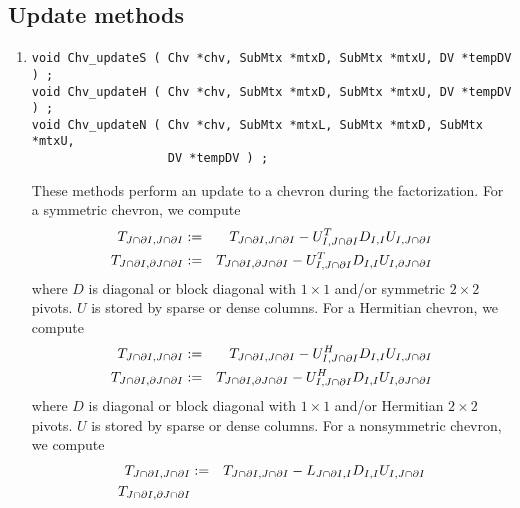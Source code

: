 \subsection{Update methods}
\label{subsection:Chv:proto:updates}
\par
\begin{enumerate}
\item
\begin{verbatim}
void Chv_updateS ( Chv *chv, SubMtx *mtxD, SubMtx *mtxU, DV *tempDV ) ;
void Chv_updateH ( Chv *chv, SubMtx *mtxD, SubMtx *mtxU, DV *tempDV ) ;
void Chv_updateN ( Chv *chv, SubMtx *mtxL, SubMtx *mtxD, SubMtx *mtxU, 
                   DV *tempDV ) ;
\end{verbatim}
These methods perform an update to a chevron during the factorization.
For a symmetric chevron, we compute
\begin{eqnarray*}
T_{J \cap {\partial}{I},J \cap {\partial}{I}} 
& := & T_{J \cap {\partial}{I},J \cap {\partial}{I}} 
- U_{I,J \cap {\partial}{I}}^T D_{I,I} U_{I, J \cap {\partial}{I}} \\
T_{J \cap {\partial}{I},{\partial}{J} \cap {\partial}{I}} 
& := & T_{J \cap {\partial}{I},{\partial}{J} \cap {\partial}{I}} 
- U_{I,J \cap {\partial}{I}}^T D_{I,I} U_{I, {\partial}{J} \cap {\partial}{I}}
\end{eqnarray*}
where $D$ is diagonal or block diagonal with $1 \times 1$ and/or
symmetric $2 \times 2$ pivots. 
$U$ is stored by sparse or dense columns.
For a Hermitian chevron, we compute
\begin{eqnarray*}
T_{J \cap {\partial}{I},J \cap {\partial}{I}} 
& := & T_{J \cap {\partial}{I},J \cap {\partial}{I}} 
- U_{I,J \cap {\partial}{I}}^H D_{I,I} U_{I, J \cap {\partial}{I}} \\
T_{J \cap {\partial}{I},{\partial}{J} \cap {\partial}{I}} 
& := & T_{J \cap {\partial}{I},{\partial}{J} \cap {\partial}{I}} 
- U_{I,J \cap {\partial}{I}}^H D_{I,I} U_{I, {\partial}{J} \cap {\partial}{I}}
\end{eqnarray*}
where $D$ is diagonal or block diagonal with $1 \times 1$ and/or
Hermitian $2 \times 2$ pivots. 
$U$ is stored by sparse or dense columns.
For a nonsymmetric chevron, we compute
\begin{eqnarray*}
T_{J \cap \bnd{I},J \cap \bnd{I}} 
& := & T_{J \cap \bnd{I},J \cap \bnd{I}} 
- L_{J \cap \bnd{I},I} D_{I,I} U_{I, J \cap \bnd{I}} \\
T_{J \cap \bnd{I},\bnd{J} \cap \bnd{I}} 

\end{eqnarray*}
\end{enumerate}
